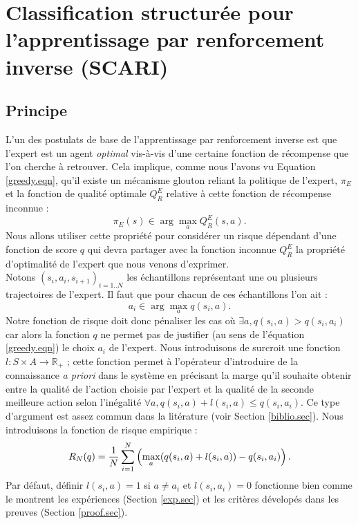 \documentclass[publibook-draft]{CAp2012}
\begin{document}
\section{Classification structurée pour l'apprentissage par renforcement inverse (SCARI)}
\subsection{Principe}
L'un des postulats de base de l'apprentissage par renforcement inverse est que l'expert est un agent \emph{optimal} vis-à-vis d'une certaine fonction de récompense que l'on cherche à retrouver. Cela implique, comme nous l'avons vu Equation \eqref{greedy.eqn}, qu'il existe un mécanisme glouton reliant la politique de l'expert, $\pi_E$ et la fonction de qualité optimale $Q^E_R$ relative à cette fonction de récompense inconnue :
\begin{equation}
\pi_E(s) \in \arg\max_aQ^E_R(s,a).
\end{equation}
Nous allons utiliser cette propriété pour considérer un risque dépendant d'une fonction de score $q$ qui devra partager avec la fonction inconnue $Q^E_R$ la propriété d'optimalité de l'expert que nous venons d'exprimer.\\
Notons $(s_i,a_i,s_{i+1})_{i=1..N}$ les échantillons représentant une ou plusieurs trajectoires de l'expert. Il faut que pour chacun de ces échantillons l'on ait :
\begin{equation}
\label{butLAFEM.eqn}
a_i \in \arg\max_aq(s_i,a).
\end{equation}
Notre fonction de risque doit donc pénaliser les cas où $\exists a, q(s_i,a)>q(s_i,a_i)$ car alors la fonction $q$ ne permet pas de justifier (au sens de l'équation \eqref{greedy.eqn}) le choix $a_i$ de l'expert. Nous introduisons de surcroit une fonction $l : S \times A \rightarrow \mathbb{R}_+$ ; cette fonction permet à l'opérateur d'introduire de la connaissance \emph{a priori} dans le système en précisant la marge qu'il souhaite obtenir entre la qualité de l'action choisie par l'expert et la qualité de la seconde meilleure action selon l'inégalité $\forall a, q(s_i,a) + l(s_i,a) \leq q(s_i,a_i)$. Ce type d'argument est assez commun dans la litérature (voir Section \ref{biblio.sec}). Nous introduisons la fonction de risque empirique :
  \begin{equation}
   R_N(q) = {1\over N} \sum_{i=1}^N\left(\max_{a}(q(s_i,a) + l(s_i,a)) - q(s_i,a_i) \right).
   \end{equation}
Par défaut, définir $l(s_i,a) = 1$ si $a\neq a_i$ et $l(s_i,a_i)=0$ fonctionne bien comme le montrent les expériences (Section \ref{exp.sec}) et les critères dévelopés dans les preuves (Section \ref{proof.sec}).\\
\end{document}
